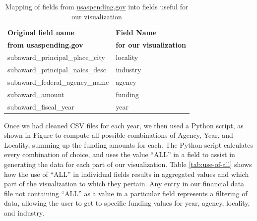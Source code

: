 \documentclass[10pt,journal,compsoc]{IEEEtran}
\begin{document}
\begin{table}[t]
\centering
\begin{tabular}{l | l}
\hline
\textbf{Original field name} & \textbf{Field Name} \\
\textbf{from usaspending.gov} & \textbf{for our visualization} \\ \hline
subaward\_principal\_place\_city         & locality                         \\
subaward\_principal\_naics\_desc         & industry                         \\
subaward\_federal\_agency\_name          & agency                           \\
subaward\_amount                         & funding                          \\
subaward\_fiscal\_year                   & year                                 \\ \hline
\end{tabular}
\caption{Mapping of fields from \protect\url{usaspending.gov} into fields useful for our visualization}
\label{tab:data-mapping}
\end{table}

Once we had cleaned CSV files for each year, we then used a Python script, as shown in Figure  to compute all possible combinations of Agency, Year, and Locality, summing up the funding amounts for each.  The Python script calculates every combination of choice, and uses the value ``ALL'' in a field to assist in generating the data for each part of our visualization.  Table \ref{tab:use-of-all} shows how the use of ``ALL'' in individual fields results in aggregated values and which part of the visualization to which they pertain.  Any entry in our financial data file not containing ``ALL'' as a value in a particular field represents a filtering of data, allowing the user to get to specific funding values for year, agency, locality, and industry.
\end{document}
